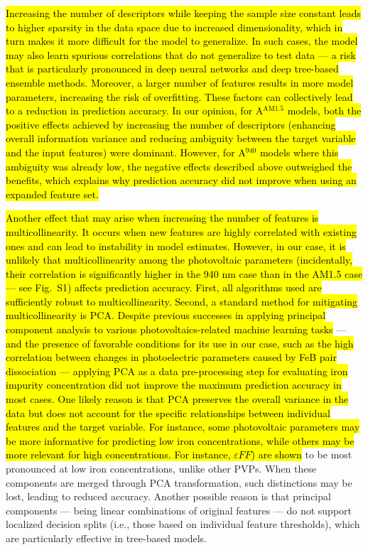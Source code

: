 \documentclass[a4paper,fleqn,draft]{cas-sc}
\begin{document}
\textcolor[rgb]{1.00,0.07,0.00}{
\hl{
Increasing the number of descriptors while keeping the sample size constant leads
to higher sparsity in the data space due to increased dimensionality,
which in turn makes it more difficult for the model to generalize.
In such cases, the model may also learn spurious correlations that do not generalize to test data ---
a risk that is particularly pronounced in deep neural networks and  deep tree-based ensemble methods.
Moreover, a larger number of features results in more model parameters, increasing the risk of overfitting.
These factors can collectively lead to a reduction in prediction accuracy.
In our opinion, for A$^\mathrm{AM1.5}$ models, both the positive effects achieved by increasing the number of descriptors
(enhancing overall information variance and reducing ambiguity between the target variable and the input features) were dominant.
However, for A$^\mathrm{940}$ models where this ambiguity was already low,
the negative effects described above outweighed the benefits,
which explains why prediction accuracy did not improve when using an expanded feature set.
}}




\textcolor[rgb]{1.00,0.07,0.00}{
\hl{
Another effect that may arise when increasing the number of features is multicollinearity.
It occurs when new features are highly correlated with existing ones and can lead to instability in model estimates.
However, in our case, it is unlikely that multicollinearity among the photovoltaic parameters
(incidentally, their correlation is significantly higher in the 940 nm case than in the AM1.5 case — see Fig.~S1)
affects prediction accuracy.
First, all algorithms used are sufficiently robust to multicollinearity.
Second, a standard method for mitigating multicollinearity is PCA.
Despite previous successes in applying principal component analysis to various
photovoltaics-related machine learning tasks} \cite{Gao2020,Fadhel2019,David2021,Liu2022,AbdullahVetter2025} ---
\hl{and the presence of favorable conditions for its use in our case,
such as the high correlation between changes in photoelectric parameters caused by FeB pair dissociation ---
applying PCA as a data pre-processing step for evaluating iron impurity concentration did not improve the maximum prediction accuracy in most cases.
One likely reason is that PCA preserves the overall variance in the data
but does not account for the specific relationships between individual features and the target variable.
For instance, some photovoltaic parameters may be more informative for predicting low iron concentrations,
while others may be more relevant for high concentrations.
For instance, $\varepsilon F\!F$) are shown} \cite{Olikh2025MSEB} to be most pronounced at low iron concentrations, unlike other PVPs.
When these components are merged through PCA transformation, such distinctions may be lost, leading to reduced accuracy.
Another possible reason is that principal components ---
being linear combinations of original features --- do not support localized decision splits
(i.e., those based on individual feature thresholds), which are particularly effective in tree-based models.
}
\end{document}

